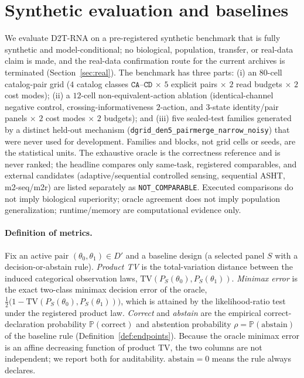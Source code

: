 \documentclass[11pt]{article}
\begin{document}
\section{Synthetic evaluation and baselines}\label{sec:eval}

We evaluate D2T-RNA on a pre-registered synthetic benchmark that is fully synthetic and
model-conditional; no biological, population, transfer, or real-data claim is made, and the real-data
confirmation route for the current archives is terminated (Section~\ref{sec:real}). The benchmark has
three parts: (i) an $80$-cell catalog-pair grid ($4$ catalog classes $\texttt{CA}$--$\texttt{CD}$
$\times$ $5$ explicit pairs $\times$ $2$ read budgets $\times$ $2$ cost modes); (ii) a $12$-cell
non-equivalent-action ablation (identical-channel negative control, crossing-informativeness
$2$-action, and $3$-state identity/pair panels $\times$ $2$ cost modes $\times$ $2$ budgets); and
(iii) five sealed-test families generated by a distinct held-out mechanism
(\texttt{dgrid\_den5\_pairmerge\_narrow\_noisy}) that were never used for development. Families and
blocks, not grid cells or seeds, are the statistical units. The exhaustive oracle is the correctness
reference and is never ranked; the headline compares only same-task, registered comparables, and
external candidates (adaptive/sequential controlled sensing, sequential ASHT, m2-seq/m2r) are listed
separately as \texttt{NOT\_COMPARABLE}. Executed comparisons do not imply biological superiority;
oracle agreement does not imply population generalization; runtime/memory are computational evidence
only.

\paragraph{Definition of metrics.}
Fix an active pair $(\theta_0,\theta_1)\in D'$ and a baseline design (a selected panel $S$ with a
decision-or-abstain rule). \emph{Product TV} is the total-variation distance between the induced
categorical observation laws, $\mathrm{TV}(P_S(\theta_0),P_S(\theta_1))$. \emph{Minimax error} is the
exact two-class minimax decision error of the oracle,
$\tfrac12\bigl(1-\mathrm{TV}(P_S(\theta_0),P_S(\theta_1))\bigr)$, which is attained by the likelihood-ratio
test under the registered product law. \emph{Correct} and \emph{abstain} are the empirical
correct-declaration probability $\mathbb{P}(\mathrm{correct})$ and abstention probability
$\rho=\mathbb{P}(\mathrm{abstain})$ of the baseline rule (Definition~\ref{def:endpoints}). Because the
oracle minimax error is an affine decreasing function of product TV, the two columns are not independent;
we report both for auditability. $\mathrm{abstain}=0$ means the rule always declares.
\end{document}
